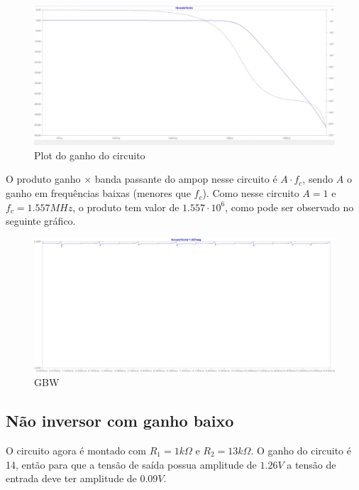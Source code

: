 \documentclass[10pt,twocolumn,letterpaper]{article}
\begin{document}
\begin{figure}[h]
\caption{Plot do ganho do circuito}
\begin{center}
\includegraphics[scale=0.15]{figuras/fig4}
\end{center}
\end{figure}

O produto ganho $\times$ banda passante do ampop nesse circuito é $A\cdot f_c$, sendo $A$ o ganho em frequências baixas (menores que $f_c$). Como nesse circuito $A=1$ e $f_c=1.557MHz$, o produto tem valor de $1.557\cdot10^6$, como pode ser observado no seguinte gráfico.

\begin{figure}[h]
\caption{GBW}
\begin{center}
\includegraphics[scale=0.15]{figuras/fig5}
\end{center}
\end{figure}


\subsection{Não inversor com ganho baixo}

O circuito agora é montado com $R_1=1k\Omega$ e $R_2=13k\Omega$. O ganho do circuito é 14, então para que a tensão de saída possua amplitude de $1.26V$ a tensão de entrada deve ter amplitude de $0.09V$.
\end{document}
